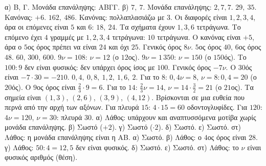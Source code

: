  α) Β, Γ. Μονάδα επανάληψης: ΑΒΓΓ. β) $7,\ 7$. Μονάδα επανάληψης: $2,7,7$.
 $29,\ 35$. Κανόνας: $+6$.
 $162,\ 486$. Κανόνας: πολλαπλασιάζω με $3$.
 Οι διαφορές είναι $1,2,3,4$, άρα οι επόμενες είναι $5$ και $6$: $18,\ 24$.
 Τα σχήματα έχουν $1,3,6$ τετράγωνα. Το επόμενο έχει $4$ γραμμές με $1,2,3,4$ τετράγωνα: $10$ τετράγωνα.
 Ο κανόνας είναι $+5$, άρα ο $5$ος όρος πρέπει να είναι $24$ και όχι $25$.
 Γενικός όρος $8\nu$. $5$ος όρος $40$, $6$ος όρος $48$.
 $60$, $300$, $600$.
 $9\nu=108$: $\nu=12$ (ο $12$ος). $9\nu=1\,350$: $\nu=150$ (ο $150$ός). Το $100:9$ δεν είναι φυσικός: δεν υπάρχει όρος ίσος με $100$.
 Γενικός όρος $-7\nu$. Ο $30$ός είναι $-7\cdot30=-210$.
 $0{,}4,\ 0{,}8,\ 1{,}2,\ 1{,}6,\ 2$. Για το $8$: $0{,}4\nu=8$, $\nu=8:0{,}4=20$ (ο $20$ός).
 Ο $9$ος όρος είναι $\frac{2}{3}\cdot9=6$. Για το $14$: $\frac{2}{3}\nu=14$, $\nu=14\cdot\frac{3}{2}=21$ (ο $21$ος).
 Τα σημεία είναι $(1,3)$, $(2,6)$, $(3,9)$, $(4,12)$. Βρίσκονται σε μια ευθεία που περνά από την αρχή των αξόνων.
 Για πλευρά $15$: $4\cdot15=60$ οδοντογλυφίδες. Για $120$: $4\nu=120$, $\nu=30$: πλευρά $30$.
 α) Λάθος: υπάρχουν και αναπτυσσόμενα μοτίβα χωρίς μονάδα επανάληψης. β) Σωστό ($+2$). γ) Σωστό ($\cdot2$). δ) Σωστό. ε) Σωστό. στ) Λάθος: η μονάδα επανάληψης είναι η ΑΒ.
 α) Σωστό. β) Λάθος: ο $4$ος όρος είναι $28$. γ) Λάθος: $50:4=12{,}5$ δεν είναι φυσικός. δ) Σωστό. ε) Σωστό. στ) Λάθος: το $\nu$ είναι φυσικός αριθμός (θέση).
